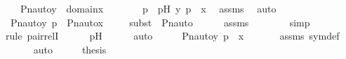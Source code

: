 \begin{isabellebody}
\ \ \ {\isachardoublequoteopen}Pn{\isacharunderscore}{\kern0pt}auto{\isacharparenleft}{\kern0pt}{\isasympi}{\isacharparenright}{\kern0pt}{\isacharbackquote}{\kern0pt}y\ {\isasymin}\ domain{\isacharparenleft}{\kern0pt}x{\isacharparenright}{\kern0pt}{\isachardoublequoteclose}\ \isanewline
%
\isadelimproof
%
\endisadelimproof
%
\isatagproof
{}\isamarkupfalse%
\ {\isacharminus}{\kern0pt}\ \isanewline
\ \ \isamarkupfalse%
\ p\ \ pH{\isacharcolon}{\kern0pt}\ {\isachardoublequoteopen}{\isacharless}{\kern0pt}y{\isacharcomma}{\kern0pt}\ p{\isachargreater}{\kern0pt}\ {\isasymin}\ x{\isachardoublequoteclose}\ \isamarkupfalse%
\ assms\ \isamarkupfalse%
\ auto\isanewline
\ \ \isamarkupfalse%
\ {\isachardoublequoteopen}{\isacharless}{\kern0pt}Pn{\isacharunderscore}{\kern0pt}auto{\isacharparenleft}{\kern0pt}{\isasympi}{\isacharparenright}{\kern0pt}{\isacharbackquote}{\kern0pt}y{\isacharcomma}{\kern0pt}\ {\isasympi}{\isacharbackquote}{\kern0pt}p{\isachargreater}{\kern0pt}\ {\isasymin}\ Pn{\isacharunderscore}{\kern0pt}auto{\isacharparenleft}{\kern0pt}{\isasympi}{\isacharparenright}{\kern0pt}{\isacharbackquote}{\kern0pt}x{\isachardoublequoteclose}\isanewline
\ \ \ \ \isamarkupfalse%
{\isacharparenleft}{\kern0pt}subst\ {\isacharparenleft}{\kern0pt}{}{\isacharparenright}{\kern0pt}\ Pn{\isacharunderscore}{\kern0pt}auto{\isacharparenright}{\kern0pt}\isanewline
\ \ \ \ \isamarkupfalse%
\ assms\ \isanewline
\ \ \ \ \ \isamarkupfalse%
\ simp\isanewline
\ \ \ \ \isamarkupfalse%
{\isacharparenleft}{\kern0pt}rule\ pair{\isacharunderscore}{\kern0pt}relI{\isacharparenright}{\kern0pt}\isanewline
\ \ \ \ \isamarkupfalse%
\ pH\isanewline
\ \ \ \ \isamarkupfalse%
\ auto\isanewline
\ \ \isamarkupfalse%
\ \isamarkupfalse%
\ {\isachardoublequoteopen}{\isacharless}{\kern0pt}Pn{\isacharunderscore}{\kern0pt}auto{\isacharparenleft}{\kern0pt}{\isasympi}{\isacharparenright}{\kern0pt}{\isacharbackquote}{\kern0pt}y{\isacharcomma}{\kern0pt}\ {\isasympi}{\isacharbackquote}{\kern0pt}p{\isachargreater}{\kern0pt}\ {\isasymin}\ x{\isachardoublequoteclose}\ \isanewline
\ \ \ \ \isamarkupfalse%
\ assms\ sym{\isacharunderscore}{\kern0pt}def\ \isanewline
\ \ \ \ \isamarkupfalse%
\ auto\isanewline
\ \ \isamarkupfalse%
\ \isamarkupfalse%
\ {\isacharquery}{\kern0pt}thesis\ \isamarkupfalse%

\end{isabellebody}
